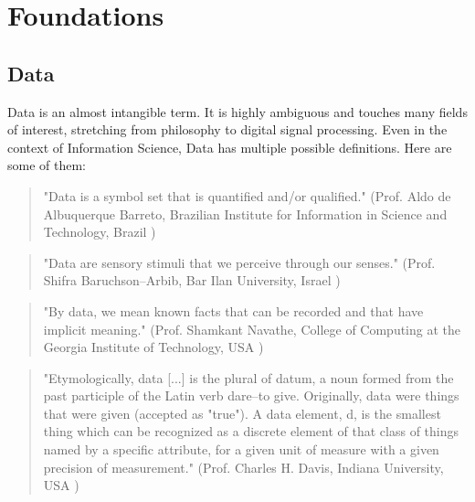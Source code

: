 \documentclass[a4paper,english,twoside,BCOR1.5cm,headsepline,DIV12,appendixprefix,final,12pt]{scrbook}
\newcommand{\provenance}{{\ttfamily\scshape\bfseries provenance}\xspace}
\newcommand{\licensing}{{\ttfamily\scshape\bfseries licensing}\xspace}
\newcommand{\access}{{\ttfamily\scshape\bfseries access}\xspace}
\newcommand{\extensibility}{{\ttfamily\scshape\bfseries extensibility}\xspace}
\newcommand{\interoperability}{{\ttfamily\scshape\bfseries interoperability}\xspace}
\newcommand{\cmdi}{{\scshape\bfseries cmdi}\xspace}
\newcommand{\dmp}{{\scshape\bfseries dmp}\xspace}
\begin{document}


\chapter{Foundations}
\label{chap:foundations}

\section{Data}
\label{sec:data}
Data is an almost intangible term. It is highly ambiguous and touches many fields of interest, stretching from philosophy to digital signal processing. Even in the context of Information Science, Data has multiple possible definitions. Here are some of them:

\begin{quote}
"Data is a symbol set that is quantified and/or qualified." (Prof. Aldo de Albuquerque Barreto, Brazilian Institute for Information in Science
and Technology, Brazil \cite{Zins2007})
\end{quote}

\begin{quote}
"Data are sensory stimuli that we perceive through our senses." (Prof. Shifra Baruchson–Arbib, Bar Ilan University, Israel \cite{Zins2007})
\end{quote}

\begin{quote}
"By data, we mean known facts that can be recorded and that have implicit meaning." (Prof. Shamkant Navathe, College of Computing at the Georgia Institute of Technology, USA \cite{elmasri06db})
\end{quote}

\begin{quote}
"Etymologically, data [...] 
is the plural of datum, a noun formed from the
past participle of the Latin verb dare–to give. Originally,
data were things that were given (accepted as "true"). A data
element, d, is the smallest thing which can be recognized as
a discrete element of that class of things named by a specific
attribute, for a given unit of measure with a given precision
of measurement." (Prof. Charles H. Davis, Indiana University, USA \cite{Zins2007})
\end{quote}
\end{document}
